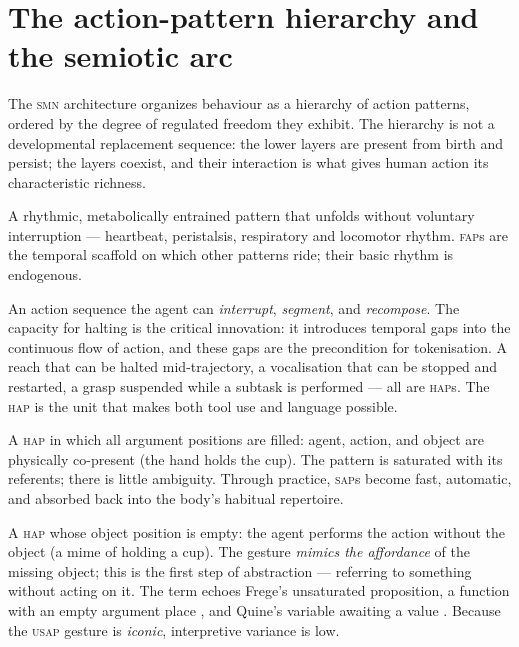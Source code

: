 \documentclass{article}
\newcommand{\smn}{\textsc{smn}}
\newcommand{\fap}{\textsc{fap}}
\newcommand{\hap}{\textsc{hap}}
\newcommand{\sap}{\textsc{sap}}
\newcommand{\usap}{\textsc{usap}}
\begin{document}
\section{The action-pattern hierarchy and the semiotic arc}\label{sec:hierarchy}

The \smn{} architecture organizes behaviour as a hierarchy of action patterns, ordered by the degree of regulated freedom they exhibit. The hierarchy is not a developmental replacement sequence: the lower layers are present from birth and persist; the layers coexist, and their interaction is what gives human action its characteristic richness.

\begin{description}[leftmargin=2em,style=nextline]
\item[Fixed Action Pattern (\fap)] A rhythmic, metabolically entrained pattern that unfolds without voluntary interruption --- heartbeat, peristalsis, respiratory and locomotor rhythm. \fap{}s are the temporal scaffold on which other patterns ride; their basic rhythm is endogenous.
\item[Haltable Action Pattern (\hap)] An action sequence the agent can \emph{interrupt}, \emph{segment}, and \emph{recompose}. The capacity for halting is the critical innovation: it introduces temporal gaps into the continuous flow of action, and these gaps are the precondition for tokenisation. A reach that can be halted mid-trajectory, a vocalisation that can be stopped and restarted, a grasp suspended while a subtask is performed --- all are \hap{}s. The \hap{} is the unit that makes both tool use and language possible.
\item[Saturated Action Pattern (\sap)] A \hap{} in which all argument positions are filled: agent, action, and object are physically co-present (the hand holds the cup). The pattern is saturated with its referents; there is little ambiguity. Through practice, \sap{}s become fast, automatic, and absorbed back into the body's habitual repertoire.
\item[Unsaturated Action Pattern (\usap)] A \hap{} whose object position is empty: the agent performs the action without the object (a mime of holding a cup). The gesture \emph{mimics the affordance} of the missing object; this is the first step of abstraction --- referring to something without acting on it. The term echoes Frege's unsaturated proposition, a function with an empty argument place \citep{Frege1891Function}, and Quine's variable awaiting a value \citep{Quine1969NaturalizedEpistemology}. Because the \usap{} gesture is \emph{iconic}, interpretive variance is low.

\end{description}
\end{document}
